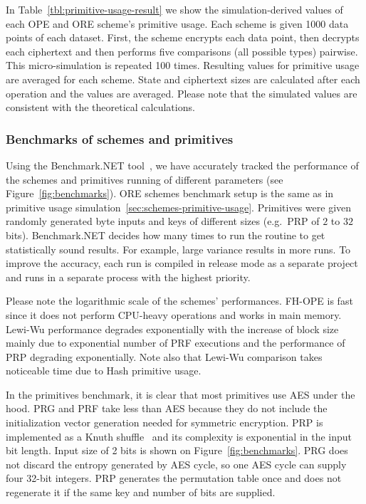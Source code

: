 			In Table~\ref{tbl:primitive-usage-result} we show the simulation-derived values of each OPE and ORE scheme's primitive usage.
			Each scheme is given 1000 data points of each dataset.
			First, the scheme encrypts each data point, then decrypts each ciphertext and then performs five comparisons (all possible types) pairwise.
			This micro-simulation is repeated 100 times.
			Resulting values for primitive usage are averaged for each scheme.
			State and ciphertext sizes are calculated after each operation and the values are averaged.
			Please note that the simulated values are consistent with the theoretical calculations.

		\subsubsection{Benchmarks of schemes and primitives}

			Using the Benchmark.NET tool~\cite{benchmark-net}, we have accurately tracked the performance of the schemes and primitives running of different parameters (see Figure~\ref{fig:benchmarks}).
			ORE schemes benchmark setup is the same as in primitive usage simulation~\ref{sec:schemes-primitive-usage}.
			Primitives were given randomly generated byte inputs and keys of different sizes (e.g.\ PRP of $2$ to $32$ bits).
			Benchmark.NET decides how many times to run the routine to get statistically sound results.
			For example, large variance results in more runs.
			To improve the accuracy, each run is compiled in release mode as a separate project and runs in a separate process with the highest priority.

			Please note the logarithmic scale of the schemes' performances.
			FH-OPE is fast since it does not perform CPU-heavy operations and works in main memory.
			Lewi-Wu performance degrades exponentially with the increase of block size mainly due to exponential number of PRF executions and the performance of PRP degrading exponentially.
			Note also that Lewi-Wu comparison takes noticeable time due to Hash primitive usage.

			In the primitives benchmark, it is clear that most primitives use AES under the hood.
			PRG and PRF take less than AES because they do not include the initialization vector generation needed for symmetric encryption.
			PRP is implemented as a Knuth shuffle~\cite{knuth-shuffle} and its complexity is exponential in the input bit length.
			Input size of 2 bits is shown on Figure~\ref{fig:benchmarks}.
			PRG does not discard the entropy generated by AES cycle, so one AES cycle can supply four 32-bit integers.
			PRP generates the permutation table once and does not regenerate it if the same key and number of bits are supplied.

